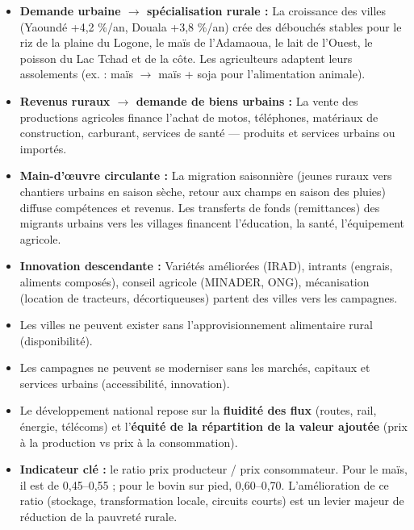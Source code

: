 \documentclass[11pt]{article}
\begin{document}
\begin{itemize}
\item \textbf{Demande urbaine $\rightarrow$ spécialisation rurale :} La croissance des villes (Yaoundé +4,2 \%/an, Douala +3,8 \%/an) crée des débouchés stables pour le riz de la plaine du Logone, le maïs de l'Adamaoua, le lait de l'Ouest, le poisson du Lac Tchad et de la côte. Les agriculteurs adaptent leurs assolements (ex. : maïs $\rightarrow$ maïs + soja pour l'alimentation animale).
\item \textbf{Revenus ruraux $\rightarrow$ demande de biens urbains :} La vente des productions agricoles finance l'achat de motos, téléphones, matériaux de construction, carburant, services de santé — produits et services urbains ou importés.
\item \textbf{Main-d'œuvre circulante :} La migration saisonnière (jeunes ruraux vers chantiers urbains en saison sèche, retour aux champs en saison des pluies) diffuse compétences et revenus. Les transferts de fonds (remittances) des migrants urbains vers les villages financent l'éducation, la santé, l'équipement agricole.
\item \textbf{Innovation descendante :} Variétés améliorées (IRAD), intrants (engrais, aliments composés), conseil agricole (MINADER, ONG), mécanisation (location de tracteurs, décortiqueuses) partent des villes vers les campagnes.
\end{itemize}

\begin{aretenir}
\begin{itemize}
\item Les villes ne peuvent exister sans l'approvisionnement alimentaire rural (disponibilité).
\item Les campagnes ne peuvent se moderniser sans les marchés, capitaux et services urbains (accessibilité, innovation).
\item Le développement national repose sur la \textbf{fluidité des flux} (routes, rail, énergie, télécoms) et l'\textbf{équité de la répartition de la valeur ajoutée} (prix à la production vs prix à la consommation).
\item \textbf{Indicateur clé :} le ratio prix producteur / prix consommateur. Pour le maïs, il est de 0,45–0,55 ; pour le bovin sur pied, 0,60–0,70. L'amélioration de ce ratio (stockage, transformation locale, circuits courts) est un levier majeur de réduction de la pauvreté rurale.
\end{itemize}
\end{aretenir}
\end{document}
